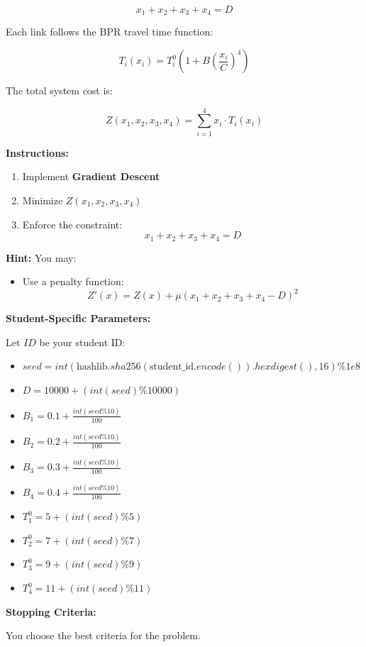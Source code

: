 \documentclass{rapportCS} %
\begin{document}
$$ x_1 + x_2 + x_3 + x_4 = D $$

Each link follows the BPR travel time function:

$$ T_i(x_i) = T_i^0 \left(1 + B \left(\frac{x_i}{C}\right)^4 \right) $$

The total system cost is:

$$ Z(x_1, x_2, x_3, x_4) = \sum_{i=1}^{4} x_i \cdot T_i(x_i) $$

\textbf{Instructions:}
\begin{enumerate}
    \item Implement \textbf{Gradient Descent}
    \item Minimize \( Z(x_1, x_2, x_3, x_4) \)
    \item Enforce the constraint:
    $$ x_1 + x_2 + x_3 + x_4 = D $$
\end{enumerate}

\textbf{Hint:}
You may:
\begin{itemize}
    \item Use a penalty function:
    $$ Z'(x) = Z(x) + \mu (x_1 + x_2 + x_3 + x_4 - D)^2 $$
\end{itemize}

\textbf{Student-Specific Parameters:}

Let \( ID \) be your student ID:

\begin{itemize}
    \item \( seed = int(\text{hashlib}.sha256(\text{student\_id}.encode()).hexdigest(), 16) \% 1e8 \)
    \item \( D = 10000 + (int(seed) \% 10000) \)
    \item \( B_1 = 0.1 + \frac{int(seed \% 10)}{100} \)
    \item \( B_2 = 0.2 + \frac{int(seed \% 10)}{100} \)
    \item \( B_3 = 0.3 + \frac{int(seed \% 10)}{100} \)
    \item \( B_4 = 0.4 + \frac{int(seed \% 10)}{100} \)
    \item \( T_1^0 = 5 + (int(seed) \% 5) \)
    \item \( T_2^0 = 7 + (int(seed) \% 7) \)
    \item \( T_3^0 = 9 + (int(seed) \% 9) \)
    \item \( T_4^0 = 11 + (int(seed) \% 11) \)
\end{itemize}

\textbf{Stopping Criteria:}

You choose the best criteria for the problem.
\end{document}
